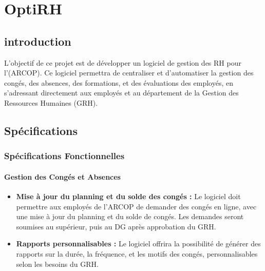 
\section{OptiRH}
\subsection{introduction}

L'objectif de ce projet est de développer un logiciel de gestion des \ac{RH} pour l'(\ac{ARCOP}). Ce logiciel permettra de centraliser et d'automatiser la gestion des congés, des absences, des formations, et des évaluations des employés, en s'adressant directement aux employés et au département de la Gestion des Ressources Humaines (GRH).
\subsection{Spécifications}
\subsubsection{Spécifications Fonctionnelles}


\paragraph{Gestion des Congés et Absences}
\begin{itemize}
    \item \textbf{Mise à jour du planning et du solde des congés :} Le logiciel doit permettre aux employés de l'\ac{ARCOP} de demander des congés en ligne, avec une mise à jour du planning et du solde de congés. Les demandes seront soumises au supérieur, puis au DG après approbation du GRH.

    
    \item \textbf{Rapports personnalisables :} Le logiciel offrira la possibilité de générer des rapports sur la durée, la fréquence, et les motifs des congés, personnalisables selon les besoins du GRH.
    

    
  
\end{itemize}

